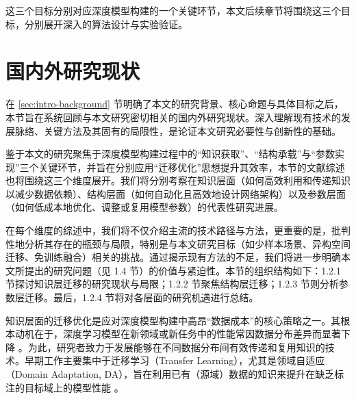 \documentclass[../main.tex]{subfiles}
\begin{document}
这三个目标分别对应深度模型构建的一个关键环节，本文后续章节将围绕这三个目标，分别展开深入的算法设计与实验验证。

\section[\hspace{-2pt}国内外研究现状]{{\heiti{}\hspace{-8pt}国内外研究现状}}
\label{sec:intro-review}

在 \ref{sec:intro-background} 节明确了本文的研究背景、核心命题与具体目标之后，本节旨在系统回顾与本文研究密切相关的国内外研究现状。深入理解现有技术的发展脉络、关键方法及其固有的局限性，是论证本文研究必要性与创新性的基础。

鉴于本文的研究聚焦于深度模型构建过程中的“知识获取”、“结构承载”与“参数实现”三个关键环节，并旨在分别应用“迁移优化”思想提升其效率，本节的文献综述也将围绕这三个维度展开。我们将分别考察在知识层面（如何高效利用和传递知识以减少数据依赖）、结构层面（如何自动化且高效地设计网络架构）以及参数层面（如何低成本地优化、调整或复用模型参数）的代表性研究进展。

在每个维度的综述中，我们将不仅介绍主流的技术路径与方法，更重要的是，批判性地分析其存在的瓶颈与局限，特别是与本文研究目标（如少样本场景、异构空间迁移、免训练融合）相关的挑战。通过揭示现有方法的不足，我们将进一步明确本文所提出的研究问题（见 1.4 节）的价值与紧迫性。本节的组织结构如下：1.2.1 节探讨知识层迁移的研究现状与局限；1.2.2 节聚焦结构层迁移；1.2.3 节则分析参数层迁移。最后，1.2.4 节将对各层面的研究机遇进行总结。


知识层面的迁移优化是应对深度模型构建中高昂“数据成本”的核心策略之一。其根本动机在于，深度学习模型在新领域或新任务中的性能常因数据分布差异而显著下降 。为此，研究者致力于发展能够在不同数据分布间有效传递和复用知识的技术。早期工作主要集中于迁移学习（Transfer Learning），尤其是领域自适应（Domain Adaptation, DA），旨在利用已有（源域）数据的知识来提升在缺乏标注的目标域上的模型性能 。
\end{document}
